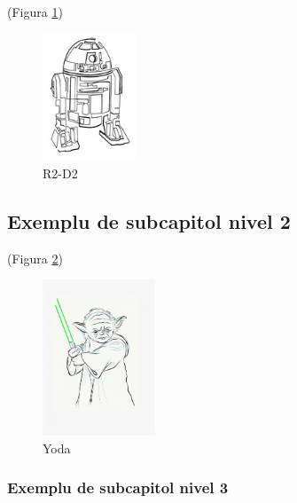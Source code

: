 \textcolor{gray}{\lipsum} (Figura \ref{fig:r2_d2})

\begin{figure}[t]
    \centering
    \includegraphics[width=0.25\textwidth]{continut/capitol1/figuri/r2_d2.png}
    \caption{R2-D2\protect\footnotemark}
    \label{fig:r2_d2}
\end{figure}

\textcolor{gray}{\lipsum} 

\subsection{Exemplu de subcapitol nivel 2}
\label{cap:cap1:ex-supcapitol:nivel2}

\textcolor{gray}{\lipsum} (Figura \ref{fig:yoda})

\begin{figure}[H]
    \centering
    \includegraphics[width=0.3\textwidth]{continut/capitol1/figuri/yoda.png}
    \caption{Yoda\protect\footnotemark}
    \label{fig:yoda}
\end{figure}

\textcolor{gray}{\lipsum}

\subsubsection{Exemplu de subcapitol nivel 3}
\label{cap:cap1:ex-subcapitol:nivel2:nivel3}

